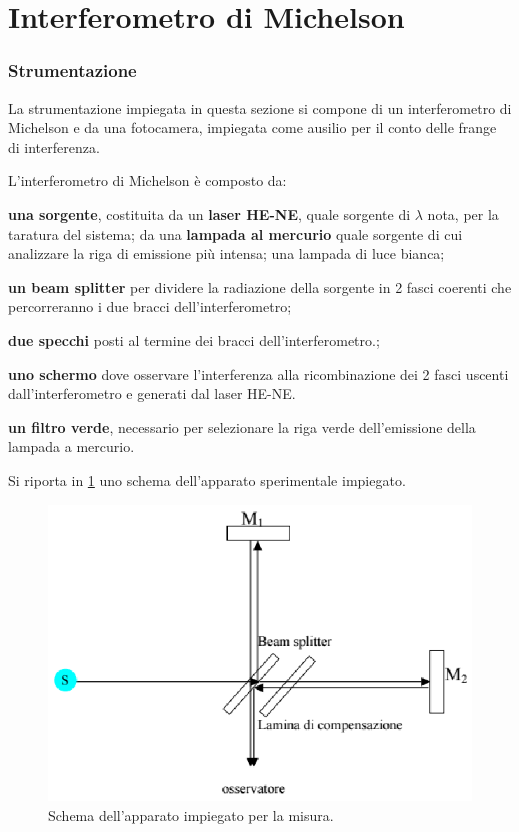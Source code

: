 \part{Interferometro di Michelson }

\section{Strumentazione}
La strumentazione impiegata in questa sezione  si 
compone di un interferometro di Michelson e da una fotocamera,
impiegata come ausilio per il conto delle frange di interferenza.

L'interferometro di Michelson è composto da:
\begin{list}{}{}
\item \textbf{una sorgente}, costituita da un \textbf{laser HE-NE}, 
quale sorgente di $\lambda$ nota,
per la taratura del sistema; da una \textbf{lampada al mercurio} quale 
sorgente di cui analizzare la riga di emissione più intensa; una lampada
di luce bianca;
\item \textbf{un beam splitter} per dividere la radiazione della sorgente
in 2 fasci coerenti che percorreranno i
due bracci dell'interferometro;
\item \textbf{due specchi} posti al termine dei bracci 
dell'interferometro.;
\item \textbf{uno schermo} dove osservare l'interferenza alla ricombinazione dei 2 
fasci uscenti dall'interferometro e generati dal laser HE-NE.
\item \textbf{un filtro verde}, necessario per selezionare 
la riga verde dell'emissione della lampada a mercurio.
\end{list}
\bigskip

Si riporta in \figurename{ \ref{fig:schema_appar2}} uno schema dell'apparato sperimentale impiegato. 
\begin{figure} [H]
	\centering
	\includegraphics[scale=0.5]{./pictures/immagine2}
	\caption{Schema dell'apparato impiegato per la misura.}
	\label{fig:schema_appar2}
\end{figure}
